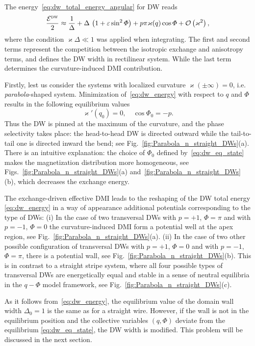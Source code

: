 The energy~\eqref{eq:dw_total_energy_angular} for DW reads
\begin{equation}\label{eq:dw_energy}
\frac{\mathcal{E}^\textsc{dw}}{2}\approx\frac{1}{\Delta}+\Delta\,\left(1+\varepsilon\sin^2\varPhi\right)+p\pi\varkappa(q)\cos\varPhi+\mathcal{O}\left(\varkappa^2\right),
\end{equation}
where the condition $\varkappa\Delta\ll1$ was applied when integrating. The first and second terms represent the competition between the isotropic exchange and anisotropy terms, and defines the DW width in rectilinear system. While the last term determines the curvature-induced DMI contribution.

Firstly, lest us consider the systems with localized curvature $\varkappa(\pm\infty)=0$, i.e. \textit{parabola}-shaped system. Minimization of~\eqref{eq:dw_energy} with respect to $q$ and $\varPhi$ results in the following equilibrium values
\begin{equation}\label{eq:dw_eq_state}
\varkappa'\left(q_0\right)=0,\quad\cos\varPhi_0=-p.
\end{equation}
Thus the DW is pinned at the maximum of the curvature, and the phase selectivity takes place: the head-to-head DW is directed outward while the tail-to-tail one is directed inward the bend; see Fig.~\ref{fig:Parabola_n_straight_DWs}(a). There is an intuitive explanation: the choice of $\varPhi_0$ defined by~\eqref{eq:dw_eq_state} makes the magnetization distribution more homogeneous, see
Figs.~\ref{fig:Parabola_n_straight_DWs}(a) and~\ref{fig:Parabola_n_straight_DWs}(b), which decreases the exchange energy.

The exchange-driven effective DMI leads to the reshaping of the DW total energy \eqref{eq:dw_energy} in a way of appearance additional potentials corresponding to the type of DWs: (i) In the case of two transversal DWs with $p=+1$, $\varPhi=\pi$ and with $p=-1$, $\varPhi=0$ the curvature-induced DMI form a potential well at the apex region, see Fig.~\ref{fig:Parabola_n_straight_DWs}(a). (ii) In the case of two other possible configuration of transversal DWs with $p=+1$, $\varPhi=0$ and with $p=-1$, $\varPhi=\pi$, there is a potential wall, see Fig.~\ref{fig:Parabola_n_straight_DWs}(b).  This is in contrast to a straight stripe system, where all four possible types of transversal DWs are energetically equal and stable in a sense of neutral equilibria in the $q-\varPhi$ model framework, see Fig.~\ref{fig:Parabola_n_straight_DWs}(c).

As it follows from~\eqref{eq:dw_energy}, the equilibrium value of the domain wall width $\Delta_0 = 1$ is the same as for a straight wire. However, if the wall is not in the equilibrium position and the collective variables $(q,\varPhi)$ deviate from the equilibrium \eqref{eq:dw_eq_state}, the DW width is modified. This problem will be discussed in the next section.

